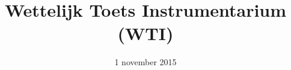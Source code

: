 \documentclass[dutch]{deltares_manual_style}
\begin{document}
\pagestyle{empty}
\cleardoublepage

\title{Wettelijk Toets Instrumentarium (WTI)}
\subtitle{}
\date{1 november 2015}
\manualtitle






%

\cleardoublepage
%
\newpage
\pagestyle{empty}
\mbox{}
\end{document}
